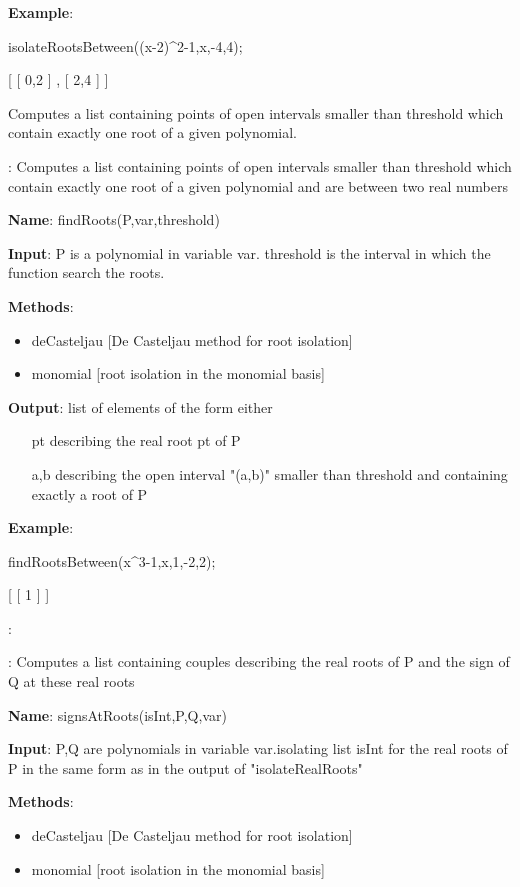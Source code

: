 \documentclass{article}
\begin{document}
{\bf Example}:

isolateRootsBetween((x-2)\^{}2-1,x,-4,4);

[ [ 0,2 ] , [ 2,4 ] ]
  
  
  Computes a list containing points of open intervals smaller than threshold
  which contain exactly one root of a given polynomial.

:
  Computes a list containing points of open intervals smaller than threshold
  which contain exactly one root of a given polynomial and are between two
  real numbers
  
{\bf Name}: findRoots(P,var,threshold)
  
{\bf Input}: P is a polynomial in variable var.
threshold is the interval in which the function search
  the roots.
  
{\bf   Methods}:
  \begin{itemize}
    \item deCasteljau [De Casteljau method for root isolation]
    \item {\color{grey} monomial [root isolation in the monomial basis]}
  \end{itemize}
  
{\bf Output}: list of elements of the form either
  \begin{itemize}
    \item [pt] describing the real root pt of P
    \item [a,b] describing the open interval "(a,b)" smaller than threshold
    and containing exactly a root of P
  \end{itemize}
  
  {\bf Example}:

findRootsBetween(x\^{}3-1,x,1,-2,2);

 [ [ 1 ] ]

:


:
  Computes a list containing couples describing the real roots of P and the
  sign of Q at these real roots
  
{\bf Name}: signsAtRoots(isInt,P,Q,var)
  
{\bf Input}: P,Q are polynomials in variable var.isolating list isInt for the real roots of P in the same
  form as in the output of "isolateRealRoots"
  
  {\bf  Methods}:
  \begin{itemize}
    \item deCasteljau [De Casteljau method for root isolation]
    \item {\color{grey} monomial [root isolation in the monomial basis]}
  \end{itemize}
  
\end{document}
